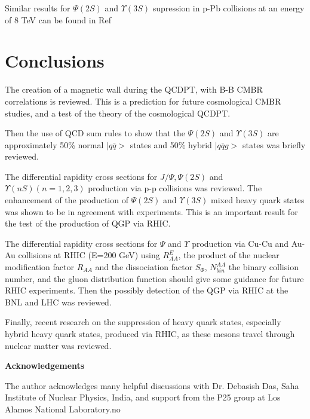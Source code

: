  Similar results for $\Psi(2S)$ and $\Upsilon(3S)$ supression in p-Pb
collisions at an energy of 8 TeV can be found in Ref\cite{kdz16}

\section{Conclusions}

   The creation of a magnetic wall during the QCDPT, with B-B CMBR 
correlations is reviewed. This is a prediction for future cosmological
CMBR studies, and a test of the theory of the cosmological QCDPT. 

Then the use of QCD sum rules to show that the $\Psi(2S)$ and $\Upsilon(3S)$
are approximately 50\% normal $|q\bar{q}>$ states and 50\% hybrid  
$|q\bar{q}g>$ states was briefly reviewed.  
 
   The differential rapidity cross sections for
$J/\Psi, \Psi(2S)$ and $\Upsilon(nS)(n=1,2,3)$ production via p-p
collisions was reviewed. The enhancement of the production of $\Psi(2S)$ and 
$\Upsilon(3S)$ mixed heavy quark states was shown to be in agreement with
experiments. This is an important result for the test of the production
of QGP via RHIC.

  The differential rapidity cross sections for $\Psi$ and  $\Upsilon$
production via Cu-Cu and Au-Au collisions at RHIC (E=200 GeV) using 
$R^E_{AA}$, the product of the nuclear modification factor $R_{AA}$ and the 
dissociation factor $S_{\Phi}$, $N^{AA}_{bin}$ the binary collision number, and 
the gluon distribution function should give some guidance for future RHIC 
experiments. Then the possibly detection of the QGP via RHIC at the BNL
and LHC was reviewed.

  Finally, recent research on the suppression of heavy quark states, especially 
hybrid heavy quark states, produced via RHIC, as these mesons travel through 
nuclear matter was reviewed.
\newpage

{\bf Acknowledgements}

\normalsize
\vspace{5mm}

 The author acknowledges many helpful discussions with Dr. Debasish Das,
Saha Institute of Nuclear Physics, India, and support from the P25 group at 
Los Alamos National Laboratory.no





